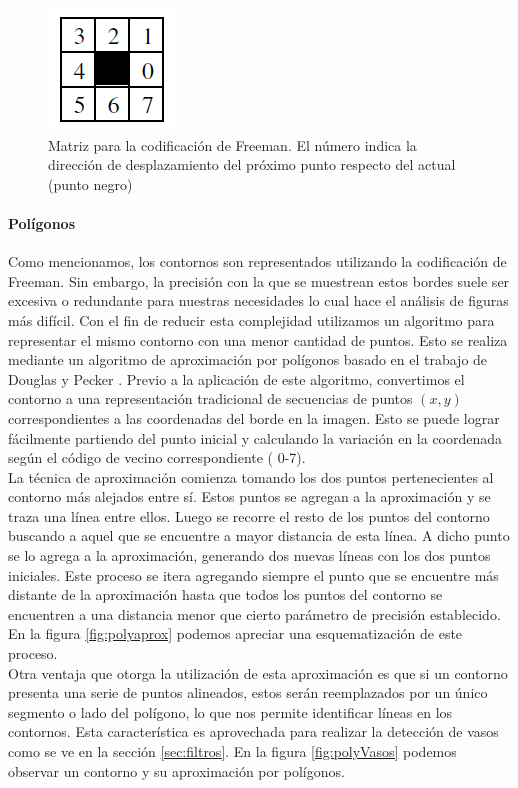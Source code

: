 \begin{figure}[htpb]
\begin{center}
  \includegraphics[scale=0.6]{vision/figures/freeman-codes.png}
\end{center}
  \caption[Matriz para la codificaci\'on de Freeman]{\small Matriz para la codificaci\'on de Freeman. El n\'umero indica la direcci\'on de desplazamiento del pr\'oximo punto respecto del
  actual (punto negro) }
  \label{fig:freeman}
\end{figure}
		
		
	\paragraph{Pol\'igonos}
	Como mencionamos, los contornos son representados utilizando la codificaci\'on de Freeman. Sin embargo, la precisi\'on con la que se muestrean estos bordes suele ser excesiva o redundante para nuestras
	necesidades lo cual hace el an\'alisis de figuras m\'as dif\'icil. Con el fin de reducir esta complejidad utilizamos un algoritmo
	para representar el mismo contorno con una menor cantidad de puntos. Esto se realiza mediante un algoritmo de aproximaci\'on por pol\'igonos
	basado en el trabajo de Douglas y Pecker \cite{dp74}. Previo a la aplicaci\'on de este algoritmo, convertimos el contorno a una representaci\'on
	tradicional de secuencias de puntos $(x,y)$ correspondientes a las 
	coordenadas del borde en la imagen. Esto se puede lograr f\'acilmente partiendo del punto inicial y calculando la variaci\'on en la coordenada seg\'un el c\'odigo de vecino correspondiente ( 0-7).\\
	\indent La t\'ecnica de aproximaci\'on comienza tomando los dos puntos 
	pertenecientes al contorno m\'as alejados entre s\'i. Estos puntos se 
	agregan a la aproximaci\'on y se traza una l\'inea entre ellos.
	Luego se recorre el resto de los puntos del contorno buscando a aquel 
	que se encuentre a mayor distancia de esta l\'inea. A dicho punto se lo 
	agrega a la aproximaci\'on, generando dos nuevas l\'ineas con los dos puntos iniciales. Este proceso se itera agregando siempre el punto que se encuentre m\'as distante de la aproximaci\'on hasta que todos los puntos del contorno se encuentren a una distancia menor que cierto par\'ametro 
	de precisi\'on establecido. En la figura \ref{fig:polyaprox} podemos 
	apreciar una esquematizaci\'on de este proceso.\\
	\indent Otra ventaja que 
	otorga la utilizaci\'on de esta aproximaci\'on es que si un contorno 
	presenta una serie de puntos alineados, estos ser\'an reemplazados por 
	un \'unico segmento o lado del pol\'igono, lo que nos permite 
	identificar l\'ineas en los contornos. Esta caracter\'istica es 
	aprovechada para realizar la detecci\'on de vasos como se ve en la  
	secci\'on \ref{sec:filtros}. En la figura \ref{fig:polyVasos} podemos observar un contorno
	y su aproximaci\'on por pol\'igonos.
	
